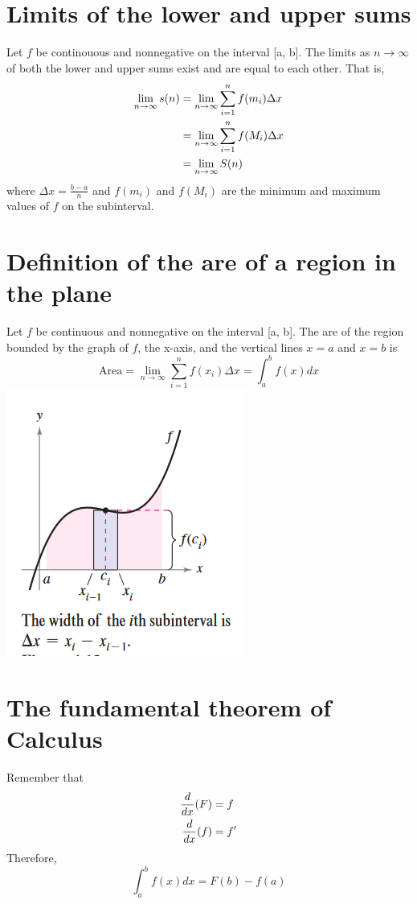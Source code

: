 \documentclass[11pt]{article}
\newcommand*{\set}{\setcounter{equation}{0}}
\begin{document}
\section{Limits of the lower and upper sums}
Let $f$ be continouous and nonnegative on the interval [a, b]. The limits as $n\to\infty$ of both the lower and upper sums exist and are equal to each other. That is,
\begin{align}
    \set
    \lim_{n\to\infty}s(n)&=\lim_{n\to\infty}\sum_{i=1}^{n}f(m_i)\Delta x\\
    &=\lim_{n\to\infty}\sum_{i=1}^{n}f(M_i)\Delta x\\
    &=\lim_{n\to\infty}S(n)
\end{align}
where $\Delta x=\frac{b-a}{n}$ and $f(m_i)$ and $f(M_i)$ are the minimum and maximum values of $f$ on the subinterval.

\section{Definition of the are of a region in the plane}
Let $f$ be continuous and nonnegative on the interval [a, b]. The are of the region bounded by the graph of $f$, the x-axis, and the vertical lines $x=a$ and $x=b$ is
\[\text{Area}=\lim_{n\to\infty}\sum_{i=1}^{n}f(x_i)\Delta x=\int_{a}^{b}f(x)dx\]
\includegraphics{area.png}

\section{The fundamental theorem of Calculus}
Remember that
\begin{align}
    \set
    \frac{d}{dx}(F)&=f\\
    \frac{d}{dx}(f)&=f'
\end{align}
Therefore,
\[\int_{a}^{b}f(x)dx=F(b)-f(a)\]
\end{document}

